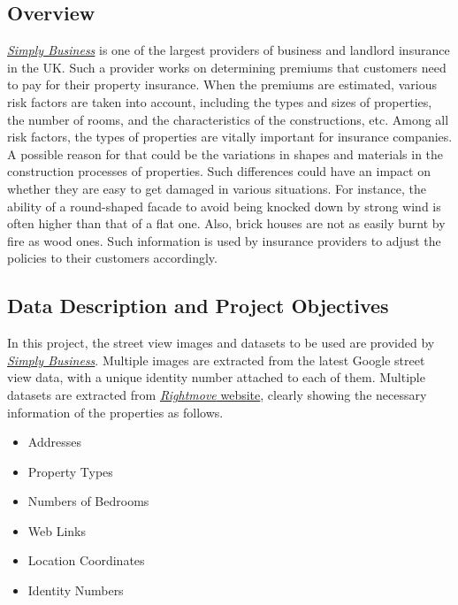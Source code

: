\documentclass[11pt,twoside]{article}
\numberwithin{Theorem}{section}
\numberwithin{Definition}{section}
\numberwithin{Lemma}{section}
\numberwithin{Algorithm}{section}
\numberwithin{equation}{section}
\begin{document}
\subsection{Overview}
\href{https://www.simplybusiness.co.uk/}{\textit{Simply Business}} is one of the largest providers of business and landlord insurance in the UK. Such a provider works on determining premiums that customers need to pay for their property insurance. When the premiums are estimated, various risk factors are taken into account, including the types and sizes of properties, the number of rooms, and the characteristics of the constructions, etc. Among all risk factors, the types of properties are vitally important for insurance companies. A possible reason for that could be the variations in shapes and materials in the construction processes of properties. Such differences could have an impact on whether they are easy to get damaged in various situations. For instance, the ability of a round-shaped facade to avoid being knocked down by strong wind is often higher than that of a flat one. Also, brick houses are not as easily burnt by fire as wood ones. Such information is used by insurance providers to adjust the policies to their customers accordingly.

\subsection{Data Description and Project Objectives}
In this project, the street view images and datasets to be used are provided by \href{https://www.simplybusiness.co.uk/}{\textit{Simply Business}}. Multiple images are extracted from the latest Google street view data, with a unique identity number attached to each of them. Multiple datasets are extracted from \href{https://www.rightmove.co.uk/}{\textit{Rightmove} website}, clearly showing the necessary information of the properties as follows.

\begin{itemize}
    \item Addresses
\item Property Types
\item Numbers of Bedrooms
\item Web Links
\item Location Coordinates
\item Identity Numbers
\end{itemize}
\end{document}
